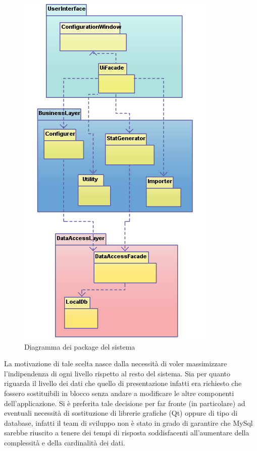 \documentclass[a4paper,13pt,twoside]{article}
\begin{document}
\begin{figure}[htpb]
\centering
\includegraphics[scale=0.5]{./images/archgen.png}
\caption{Diagramma dei package del sistema}
\label{fig:archgen}
\end{figure}
La motivazione di tale scelta nasce dalla necessità di voler massimizzare l'indipendenza di ogni livello rispetto al resto del sistema. Sia per quanto riguarda il livello dei dati che quello di presentazione infatti era richiesto che fossero sostituibili in blocco senza andare a modificare le altre componenti dell'applicazione. Si è preferita tale decisione per far fronte (in particolare) ad eventuali necessità di sostituzione di librerie grafiche (Qt) oppure di tipo di database, infatti il team di sviluppo non è stato in grado di garantire che MySql sarebbe riuscito a tenere dei tempi di risposta soddisfacenti all'aumentare della complessità e della cardinalità dei dati.
\end{document}
